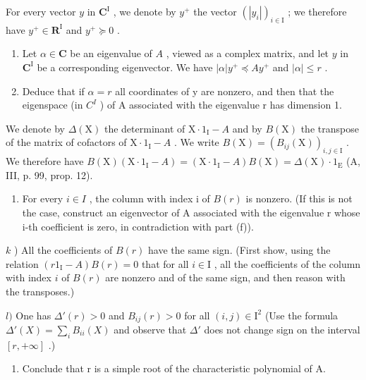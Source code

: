 For every vector \(y\) in \(\mathbf{C}^{\mathrm{I}}\) , we denote by \(y^{+}\) the vector \((|y_{i}|)_{i\in \mathrm{I}}\) ; we therefore have \(y^{+}\in \mathbf{R}^{\mathrm{I}}\) and \(y^{+}\succcurlyeq 0\) .

\begin{enumerate}
\def\labelenumi{\alph{enumi})}
\setcounter{enumi}{7}
\item
  Let \(\alpha \in \mathbf{C}\) be an eigenvalue of \(A\) , viewed as a complex matrix, and let \(y\) in \(\mathbf{C}^{\mathrm{I}}\) be a corresponding eigenvector. We have \(|\alpha|y^{+} \preccurlyeq Ay^{+}\) and \(|\alpha| \leqslant r\) .
\item
  Deduce that if \(\alpha = r\) all coordinates of y are nonzero, and then that the eigenspace (in \(C^{I}\) ) of A associated with the eigenvalue r has dimension 1.
\end{enumerate}

We denote by \(\Delta(\mathrm{X})\) the determinant of \(\mathrm{X} \cdot 1_{\mathrm{I}} - A\) and by \(B(\mathrm{X})\) the transpose of the matrix of cofactors of \(\mathrm{X} \cdot 1_{\mathrm{I}} - A\) . We write \(B(\mathrm{X}) = (B_{ij}(\mathrm{X}))_{i,j \in \mathrm{I}}\) . We therefore have \(B(\mathrm{X})(\mathrm{X} \cdot 1_{\mathrm{I}} - A) = (\mathrm{X} \cdot 1_{\mathrm{I}} - A)B(\mathrm{X}) = \Delta(\mathrm{X}) \cdot 1_{\mathrm{E}}\) (A, III, p. 99, prop. 12).

\begin{enumerate}
\def\labelenumi{\alph{enumi})}
\setcounter{enumi}{9}
\tightlist
\item
  For every \(i \in I\) , the column with index i of \(B(r)\) is nonzero. (If this is not the case, construct an eigenvector of A associated with the eigenvalue r whose i-th coefficient is zero, in contradiction with part (f)).
\end{enumerate}

\(k\) ) All the coefficients of \(B(r)\) have the same sign. (First show, using the relation \((r1_{\mathrm{I}} - A)B(r) = 0\) that for all \(i\in \mathrm{I}\) , all the coefficients of the column with index \(i\) of \(B(r)\) are nonzero and of the same sign, and then reason with the transposes.)

\(l)\) One has \(\Delta'(r) > 0\) and \(B_{ij}(r) > 0\) for all \((i,j) \in \mathrm{I}^2\) (Use the formula \(\Delta'(X) = \sum_i B_{ii}(X)\) and observe that \(\Delta'\) does not change sign on the interval \([r, +\infty]\) .)

\begin{enumerate}
\def\labelenumi{\alph{enumi})}
\setcounter{enumi}{12}
\tightlist
\item
  Conclude that r is a simple root of the characteristic polynomial of A.
\end{enumerate}

